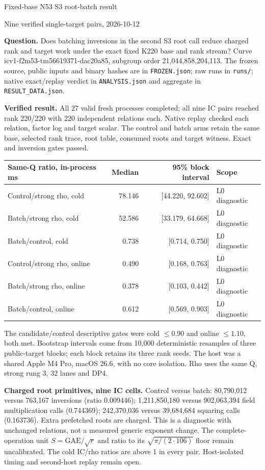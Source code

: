 \documentclass[10pt]{article}
\begin{document}
\begin{center}
{\Large Fixed-base N53 S3 root-batch result}\par
Nine verified single-target pairs, 2026-10-12
\end{center}
\noindent\textbf{Question.} Does batching inversions in the second S3
root call reduce charged rank and target work under the exact fixed K220
base and rank stream? Curve icv1-f2m53-tm56619371-dac20a85, subgroup
order 21,044,858,204,113. The frozen source, public inputs and binary
hashes are in \texttt{FROZEN.json}; raw runs in \texttt{runs/};
native exact/replay verdict in \texttt{ANALYSIS.json} and aggregate in
\texttt{RESULT\_DATA.json}.

\smallskip
\noindent\textbf{Verified result.} All 27 valid fresh processes
completed; all nine IC pairs reached rank 220/220 with 220 independent
relations each. Native replay checked each relation, factor log and
target scalar. The control and batch arms retain the same base, selected
rank trace, root table, consumed roots and target witness. Exact and
inversion gates passed.

\begin{center}
\begin{tabular}{lrrl}
\toprule
Same-Q ratio, in-process ms & Median & 95\% block interval & Scope\\
\midrule
Control/strong rho, cold & 78.146 & [44.220, 92.602] & L0 diagnostic\\
Batch/strong rho, cold & 52.586 & [33.179, 64.668] & L0 diagnostic\\
Batch/control, cold & 0.738 & [0.714, 0.750] & L0 diagnostic\\
Control/strong rho, online & 0.490 & [0.168, 0.763] & L0 diagnostic\\
Batch/strong rho, online & 0.378 & [0.103, 0.442] & L0 diagnostic\\
Batch/control, online & 0.612 & [0.569, 0.903] & L0 diagnostic\\
\bottomrule
\end{tabular}
\end{center}
\noindent The candidate/control descriptive gates were cold
\(\leq 0.90\) and online \(\leq 1.10\), both met. Bootstrap intervals
come from 10,000 deterministic resamples of three public-target blocks;
each block retains its three rank seeds. The host was a shared Apple M4
Pro, macOS 26.6, with no core isolation. Rho uses the same Q, strong
rung 3, 32 lanes and DP4.

\smallskip
\noindent\textbf{Charged root primitives, nine IC cells.}
Control versus batch: 80,790,012 versus 763,167 inversions
(ratio 0.009446); 1,211,850,180 versus 902,063,394 field
multiplication calls (0.744369); 242,370,036 versus 39,684,684
squaring calls (0.163736). Extra prefetched roots are charged.
This is a diagnostic with unchanged relations, not a measured generic
exponent change. The complete-operation unit
\(S=\mathrm{GAE}/\sqrt{r}\) and ratio to its
\(\sqrt{\pi/(2\cdot106)}\) floor remain uncalibrated.
The cold IC/rho ratios are above 1 in every pair.
Host-isolated timing and second-host replay remain open.
\end{document}
